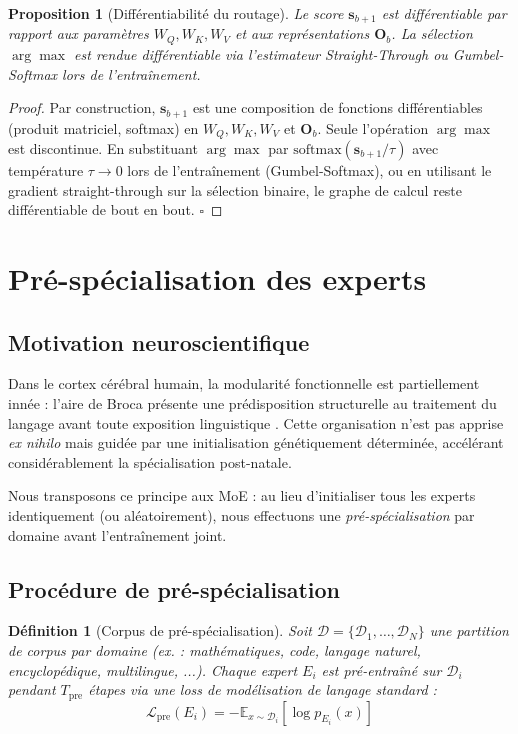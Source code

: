 \documentclass[10pt,a4paper]{article}
\newtheorem{proposition}[theorem]{Proposition}
\newtheorem{definition}{Définition}
\begin{document}
\begin{proposition}[Différentiabilité du routage]
Le score $\mathbf{s}_{b+1}$ est différentiable par rapport aux paramètres $W_Q, W_K, W_V$ et aux représentations $\mathbf{O}_b$. La sélection $\arg\max$ est rendue différentiable via l'estimateur Straight-Through \cite{bengio2013estimating} ou Gumbel-Softmax \cite{jang2017categorical} lors de l'entraînement.
\end{proposition}

\begin{proof}
Par construction, $\mathbf{s}_{b+1}$ est une composition de fonctions différentiables (produit matriciel, softmax) en $W_Q, W_K, W_V$ et $\mathbf{O}_b$. Seule l'opération $\arg\max$ est discontinue. En substituant $\arg\max$ par $\text{softmax}(\mathbf{s}_{b+1}/\tau)$ avec température $\tau \to 0$ lors de l'entraînement (Gumbel-Softmax), ou en utilisant le gradient straight-through sur la sélection binaire, le graphe de calcul reste différentiable de bout en bout. $\square$
\end{proof}

\section{Pré-spécialisation des experts}

\subsection{Motivation neuroscientifique}

Dans le cortex cérébral humain, la modularité fonctionnelle est partiellement innée : l'aire de Broca présente une prédisposition structurelle au traitement du langage avant toute exposition linguistique \cite{dehaene2005neural}. Cette organisation n'est pas apprise \textit{ex nihilo} mais guidée par une initialisation génétiquement déterminée, accélérant considérablement la spécialisation post-natale.

Nous transposons ce principe aux MoE : au lieu d'initialiser tous les experts identiquement (ou aléatoirement), nous effectuons une \textit{pré-spécialisation} par domaine avant l'entraînement joint.

\subsection{Procédure de pré-spécialisation}

\begin{definition}[Corpus de pré-spécialisation]
Soit $\mathcal{D} = \{\mathcal{D}_1, \ldots, \mathcal{D}_N\}$ une partition de corpus par domaine (ex. : mathématiques, code, langage naturel, encyclopédique, multilingue, ...). Chaque expert $E_i$ est pré-entraîné sur $\mathcal{D}_i$ pendant $T_{\text{pre}}$ étapes via une loss de modélisation de langage standard :
\begin{equation}
  \mathcal{L}_{\text{pre}}(E_i) = -\mathbb{E}_{x \sim \mathcal{D}_i}\left[\log p_{E_i}(x)\right]
\end{equation}
\end{definition}
\end{document}
